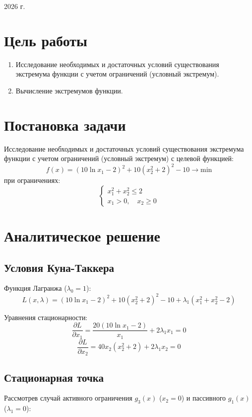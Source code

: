 \documentclass[a4paper,12pt]{article}
\begin{document}
\vfill

\begin{center}
    \large 2026 г.
\end{center}

\newpage

\pagestyle{plain}

\section*{Цель работы}
\begin {enumerate}
\item Исследование необходимых и достаточных условий существования экстремума функции с учетом ограничений (условный экстремум).
\item Вычисление экстремумов функции.
\end {enumerate}
\section*{Постановка задачи}
Исследование необходимых и достаточных условий существования экстремума функции с учетом ограничений (условный экстремум) с целевой функцией:
$$f(x) = (10\ln x_1 - 2)^2 + 10(x_2^2 + 2)^2 - 10 \rightarrow \text{min}$$
при ограничениях:
$$\begin{cases}
x_1^2 + x_2^2 \le 2 \\
x_1 > 0, \quad x_2 \ge 0
\end{cases}$$

\section*{Аналитическое решение}

\subsection*{Условия Куна-Таккера}
Функция Лагранжа ($\lambda_0=1$):
$$L(x, \lambda) = (10\ln x_1 - 2)^2 + 10(x_2^2 + 2)^2 - 10 + \lambda_1(x_1^2 + x_2^2 - 2)$$

Уравнения стационарности:
$$\frac{\partial L}{\partial x_1} = \frac{20(10\ln x_1 - 2)}{x_1} + 2\lambda_1 x_1 = 0$$
$$\frac{\partial L}{\partial x_2} = 40x_2(x_2^2 + 2) + 2\lambda_1 x_2 = 0$$

\subsection*{Стационарная точка}
Рассмотрев случай активного ограничения $g_3(x)$ ($x_2 = 0$) и пассивного $g_1(x)$ ($\lambda_1 = 0$):
\end{document}
